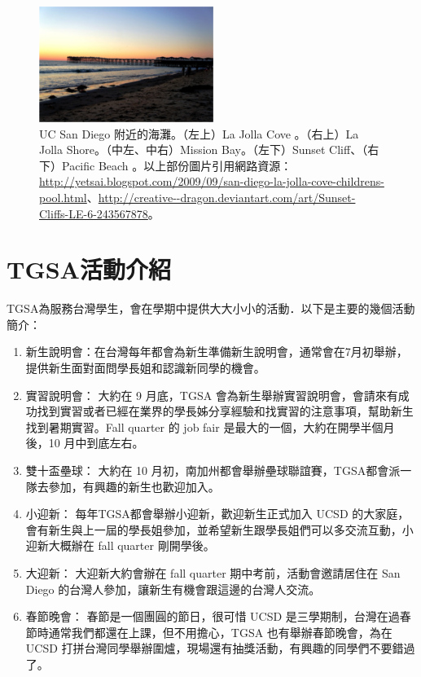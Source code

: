 \documentclass[10pt,a4paper]{book}
\begin{document}
\begin{CJK}{UTF8}{bkai}
\begin{figure}[H]
\includegraphics[width=0.505\textwidth]{Pics/pacific_beach}
\caption{UC San Diego 附近的海灘。（左上）La Jolla Cove 。（右上）La Jolla Shore。（中左、中右）Mission Bay。（左下）Sunset Cliff、（右下）Pacific Beach 。以上部份圖片引用網路資源：\url{http://yetsai.blogspot.com/2009/09/san-diego-la-jolla-cove-childrens-pool.html}、\url{http://creative--dragon.deviantart.com/art/Sunset-Cliffs-LE-6-243567878}。}
\end{figure}

\section{TGSA活動介紹}

TGSA為服務台灣學生，會在學期中提供大大小小的活動．以下是主要的幾個活動簡介：
\begin{enumerate}

\item{新生說明會：}在台灣每年都會為新生準備新生說明會，通常會在7月初舉辦，提供新生面對面問學長姐和認識新同學的機會。

\item{實習說明會：}
大約在 9 月底，TGSA 會為新生舉辦實習說明會，會請來有成功找到實習或者已經在業界的學長姊分享經驗和找實習的注意事項，幫助新生找到暑期實習。Fall quarter 的 job fair 是最大的一個，大約在開學半個月後，10 月中到底左右。

\item{雙十盃壘球：}
大約在 10 月初，南加州都會舉辦壘球聯誼賽，TGSA都會派一隊去參加，有興趣的新生也歡迎加入。

\item{小迎新：}
每年TGSA都會舉辦小迎新，歡迎新生正式加入 UCSD 的大家庭，會有新生與上一屆的學長姐參加，並希望新生跟學長姐們可以多交流互動，小迎新大概辦在 fall quarter 剛開學後。

\item{大迎新：}
大迎新大約會辦在 fall quarter 期中考前，活動會邀請居住在 San Diego 的台灣人參加，讓新生有機會跟這邊的台灣人交流。

\item{春節晚會：}
春節是一個團圓的節日，很可惜 UCSD 是三學期制，台灣在過春節時通常我們都還在上課，但不用擔心，TGSA 也有舉辦春節晚會，為在 UCSD 打拼台灣同學舉辦圍爐，現場還有抽獎活動，有興趣的同學們不要錯過了。


\end{enumerate}
\end{CJK}
\end{document}
